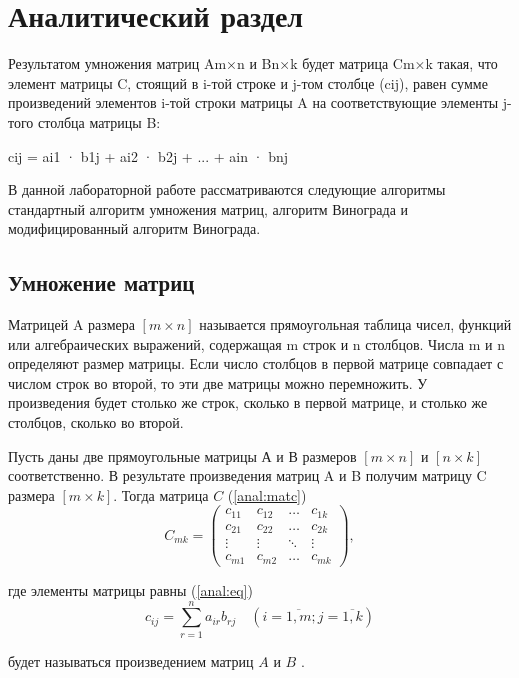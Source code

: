 \chapter{Аналитический раздел}

Результатом умножения матриц Am×n и Bn×k будет матрица Cm×k такая, что элемент матрицы C, стоящий в i-той строке и j-том столбце (cij), равен сумме произведений элементов i-той строки матрицы A на соответствующие элементы j-того столбца матрицы B:

cij = ai1 · b1j + ai2 · b2j + ... + ain · bnj \cite{oprMultMatr}

В данной лабораторной работе рассматриваются следующие алгоритмы стандартный алгоритм умножения матриц, алгоритм Винограда и модифицированный алгоритм Винограда.

\section{Умножение матриц}

Матрицей A размера $[m \times n]$ называется прямоугольная таблица
чисел, функций или алгебраических выражений, содержащая m строк и n столбцов. Числа m и n определяют размер матрицы.\cite{Beloysov} Если число столбцов в первой матрице совпадает с числом строк во второй, то эти две матрицы можно перемножить. У произведения будет столько же строк, сколько в первой матрице, и столько же столбцов, сколько во второй. 

Пусть даны две прямоугольные матрицы А и В размеров $[m \times n]$ и $[n \times k]$ соответственно.  
В результате произведения матриц A и B получим матрицу C размера $[m \times  k]$. Тогда матрица $C$ (\ref{anal:matc})
\begin{equation}
	\label{anal:matc}
	C_{mk} = \begin{pmatrix}
		c_{11} & c_{12} & \ldots & c_{1k}\\
		c_{21} & c_{22} & \ldots & c_{2k}\\
		\vdots & \vdots & \ddots & \vdots\\
		c_{m1} & c_{m2} & \ldots & c_{mk}
	\end{pmatrix},
\end{equation}

где элементы матрицы равны (\ref{anal:eq})
\begin{equation}
	\label{anal:eq}
	c_{ij} =
	\sum_{r=1}^{n} a_{ir}b_{rj} \quad (i=\overline{1,m}; j=\overline{1,k})
\end{equation}

будет называться произведением матриц $A$ и $B$ \cite{Beloysov}.

